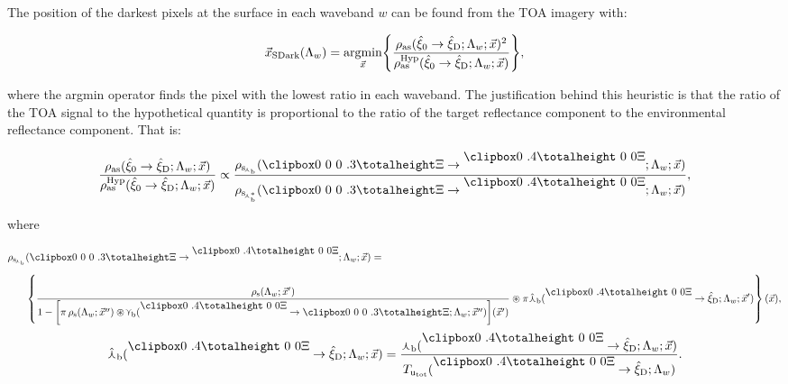 The position of the darkest pixels at the surface in each waveband $w$ can be found from the TOA imagery with:

\begin{equation}
\openup 2\jot
\vec{x}_\text{SDark}(\Lambda_w) = \argmin\limits_{\vec{x}} \Biggr\{ \frac{\rho_\text{as}(\hat{\xi}_0 \rightarrow \hat{\xi}_\text{D}; \Lambda_w; \vec{x})^2}{\rho_\text{as}^\text{Hyp}(\hat{\xi}_0 \rightarrow \hat{\xi}_\text{D}; \Lambda_w; \vec{x})} \Biggr\},
\label{eq:darkest_pixel_surf}
\end{equation}

\noindent where the argmin operator finds the pixel with the lowest ratio in each waveband. The justification behind this heuristic is that the ratio of the TOA signal to the hypothetical quantity is proportional to the ratio of the target reflectance component to the environmental reflectance component. That is:

\begin{equation}
\openup 2\jot
\frac{\rho_\text{as}(\hat{\xi}_0 \rightarrow \hat{\xi}_\text{D}; \Lambda_w; \vec{x})}{\rho_\text{as}^\text{Hyp}(\hat{\xi}_0 \rightarrow \hat{\xi}_\text{D}; \Lambda_w; \vec{x})} \propto \frac{\rho_{\text{s}_{\!\curlywedge_\text{b}}}(\hemidn \rightarrow \hemiup; \Lambda_w; \vec{x})}{\rho_{\text{s}_{\!\curlywedge_\text{b}^*}}(\hemidn \rightarrow \hemiup; \Lambda_w; \vec{x})},
\label{eq:darkest_pixel_surf_prop}
\end{equation}

\noindent where

\begin{equation}
\openup 2\jot
\begin{split}
\rho_{\text{s}_{\!\curlywedge_\text{b}}}&(\hemidn \rightarrow \hemiup; \Lambda_w; \vec{x}) = \\
&\left\{ \frac{\rho_\text{s}(\Lambda_w; \vec{x}^\prime)}{1 - \left[ \pi \, \rho_\text{s}(\Lambda_w; \vec{x}^{\prime\prime}) \circledast \! \curlyvee_{\!\text{b}}(\hemiup \rightarrow \hemidn; \Lambda_w; \vec{x}^{\prime\prime}) \right]\!(\vec{x}^\prime)} \circledast \pi \hat{\curlywedge}_\text{b}(\hemiup \rightarrow \hat{\xi}_\text{D};\Lambda_w;\vec{x}^\prime) \right\} (\vec{x}),
\end{split}
\label{eq:ret_rho_ave_total}
\end{equation}
\begin{equation}
\hat{\curlywedge}_\text{b}(\hemiup \rightarrow \hat{\xi}_\text{D};\Lambda_w;\vec{x}) = \frac{\curlywedge_\text{b}(\hemiup \rightarrow \hat{\xi}_\text{D};\Lambda_w;\vec{x})}{T_{\text{u}_\text{tot}}(\hemiup \rightarrow \hat{\xi}_\text{D};\Lambda_w)}.
\label{eq:unit_psf}
\end{equation}

